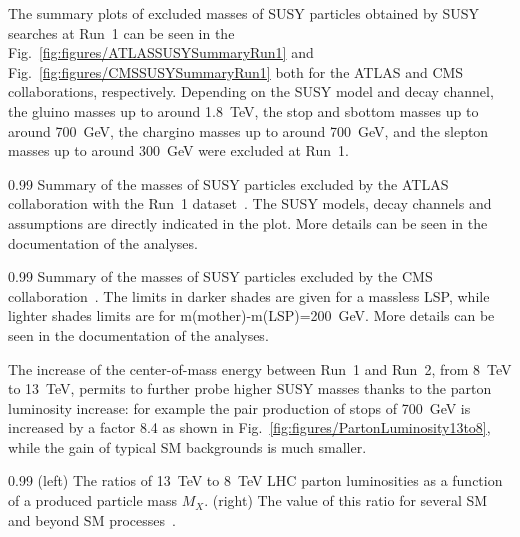 The summary plots of excluded masses of SUSY particles obtained by SUSY searches at Run~1 can be seen in the Fig.~\ref{fig:figures/ATLASSUSYSummaryRun1} and Fig.~\ref{fig:figures/CMSSUSYSummaryRun1} both for the ATLAS and CMS collaborations, respectively. Depending on the SUSY model and decay channel, the gluino masses up to around 1.8~TeV, the stop and sbottom masses up to around 700~GeV, the chargino masses up to around 700~GeV, and the slepton masses up to around 300~GeV were excluded at Run~1. 


                 {0.99}       %
                 {Summary of the masses of SUSY particles excluded by the ATLAS collaboration with the Run~1 dataset~\cite{website:SUSYresRunIATLAS}. The SUSY models, decay channels and assumptions are directly indicated in the plot. More details can be seen in the documentation of the analyses. }


                 {0.99}       %
                 {Summary of the masses of SUSY particles excluded by the CMS collaboration~\cite{website:SUSYresRunI}. The limits in darker shades are given for a massless LSP, while lighter shades limits are for m(mother)-m(LSP)=200~GeV. More details can be seen in the documentation of the analyses. }

The increase of the center-of-mass energy between Run~1 and Run~2, from 8~TeV to 13~TeV, permits to further probe higher SUSY masses thanks to  the parton luminosity increase: for example the pair production of stops of 700~GeV is increased by a factor 8.4 as shown in Fig.~\ref{fig:figures/PartonLuminosity13to8}, while the gain of typical SM backgrounds is much smaller.

                 {0.99}       %
                 {(left) The ratios of 13~TeV to 8~TeV LHC parton luminosities as a function of a produced particle mass $M_{X}$. (right) The value of this ratio for several SM and beyond SM processes~\cite{Hoecker:2236645}.}


